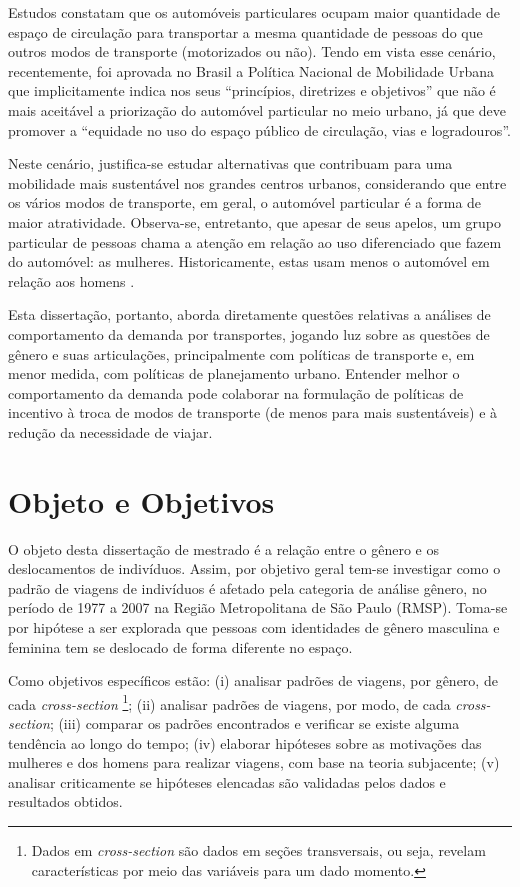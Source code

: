 Estudos constatam \cite{VASCONCELLOS2001,RUEDA2007} que os automóveis particulares ocupam maior quantidade de espaço de circulação para transportar a mesma quantidade de pessoas do que outros modos de transporte (motorizados ou não).  
Tendo em vista esse cenário, recentemente, foi aprovada no Brasil a Política Nacional de Mobilidade Urbana \cite{PNMU} que implicitamente indica nos seus ``princípios, diretrizes e objetivos'' que não é mais aceitável a priorização do automóvel particular no meio urbano, já que deve promover a ``equidade no uso do espaço público de circulação, vias e logradouros''.

Neste cenário, justifica-se estudar alternativas que contribuam para uma mobilidade mais sustentável nos grandes centros urbanos, considerando que entre os vários modos de transporte, em geral, o automóvel particular é a forma de maior atratividade. Observa-se, entretanto, que apesar de seus apelos, um grupo particular de pessoas chama a atenção em relação ao uso diferenciado que fazem do automóvel: as mulheres.
Historicamente, estas usam menos o automóvel em relação aos homens \cite{FOX1983,HJORTHOL2000,POLK2003,BEST2005}.

Esta dissertação, portanto, aborda diretamente questões relativas a análises de comportamento da demanda por transportes, jogando luz sobre as questões de  gênero e suas articulações, principalmente com políticas de transporte e, em menor medida, com políticas de planejamento urbano. Entender melhor o comportamento da demanda pode colaborar na formulação de políticas de incentivo à troca de modos de transporte (de menos para mais sustentáveis) e à redução da necessidade de viajar.

\section{Objeto e Objetivos}
O objeto desta dissertação de mestrado é a relação entre o gênero e os deslocamentos de indivíduos. Assim, por objetivo geral tem-se investigar como o padrão de viagens de indivíduos é afetado pela categoria de análise gênero, no período de 1977 a 2007 na Região Metropolitana de São Paulo (RMSP). Toma-se por hipótese a ser explorada que pessoas com identidades de gênero masculina e feminina tem se deslocado de forma diferente no espaço.

Como objetivos específicos estão: %
(i) analisar padrões de viagens, por gênero, de cada \emph{cross-section}
\footnote{Dados em \emph{cross-section} são dados em seções transversais, ou seja, revelam características por meio das variáveis para um dado momento.};
(ii) analisar padrões de viagens, por modo, de cada \emph{cross-section};
(iii) comparar os padrões encontrados e verificar se existe alguma tendência ao longo do tempo; (iv) elaborar hipóteses sobre as motivações das mulheres e dos homens para realizar viagens, com base na teoria subjacente; (v) analisar criticamente se hipóteses elencadas são validadas pelos dados e resultados obtidos.



